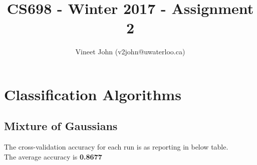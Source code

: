 \documentclass[a4paper]{article}
\title{CS698 - Winter 2017 - Assignment 2}
\author{Vineet John (v2john@uwaterloo.ca)}
\date{}
\begin{document}
\maketitle

\renewcommand\thesubsection{\alph{subsection}}

\section{Classification Algorithms}

\subsection{Mixture of Gaussians}
The cross-validation accuracy for each run is as reporting in below table.\\
The average accuracy is \textbf{0.8677}
\end{document}

